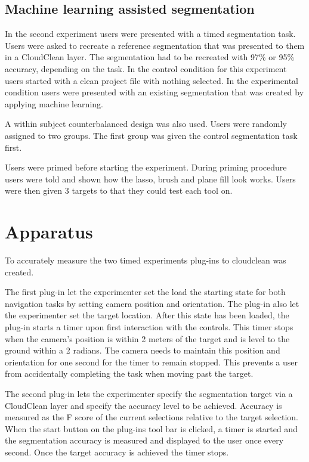 \subsection{Machine learning assisted segmentation}
In the second experiment users were presented with a timed segmentation task. Users were asked to recreate a reference segmentation that was presented to them in a CloudClean layer. The segmentation had to be recreated with 97\% or 95\% accuracy, depending on the task. In the control condition for this experiment users started with a clean project file with nothing selected. In the experimental condition users were presented with an existing segmentation that was created by applying machine learning.

A within subject counterbalanced design was also used. Users were randomly assigned to two groups. The first group was given the control segmentation task first.

Users were primed before starting the experiment. During priming procedure users were told and shown how the lasso, brush and plane fill look works. Users were then given 3 targets to that they could test each tool on.

\section{Apparatus} \label{sec:apparatus}
To accurately measure the two timed experiments plug-ins to cloudclean was created.

The first plug-in let the experimenter set the load the starting state for both navigation tasks by setting camera position and orientation. The plug-in also let the experimenter set the target location. After this state has been loaded, the plug-in starts a timer upon first interaction with the controls. This timer stops when the camera's position is within 2 meters of the target and is level to the ground within a 2 radians. The camera needs to maintain this position and orientation for one second for the timer to remain stopped. This prevents a user from accidentally completing the task when moving past the target.

The second plug-in lets the experimenter specify the segmentation target via a CloudClean layer and specify the accuracy level to be achieved. Accuracy is measured as the F score of the current selections relative to the target selection. When the start button on the plug-ins tool bar is clicked, a timer is started and the segmentation accuracy is measured and displayed to the user once every second. Once the target accuracy is achieved the timer stops.

